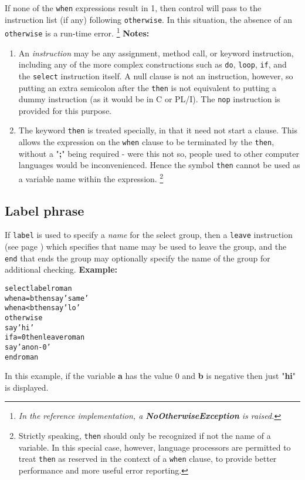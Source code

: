 If none of the \texttt{when} expressions result in 1, then control will
pass to the instruction list (if any) following \texttt{otherwise}.
In this situation, the absence of an \texttt{otherwise} is a run-time
error.
\footnote{
\emph{In the reference implementation, a \textbf{NoOtherwiseException}
is raised.}
}
 \textbf{Notes:}
\begin{enumerate}
\item An \emph{instruction} may be any assignment, method call, or keyword
instruction, including any of the more complex constructions such as
\texttt{do}, \texttt{loop}, \texttt{if}, and the \texttt{select}
instruction itself.
A null clause is not an instruction, however, so putting an extra
semicolon after the \texttt{then} is not equivalent to putting a dummy
instruction (as it would be in C or PL/I).
The \texttt{nop} instruction is provided for this purpose.
\item The keyword \texttt{then} is treated specially, in that it need not
start a clause.
This allows the expression on the \texttt{when} clause to be terminated
by the \texttt{then}, without a "\textbf{;}" being required
- were this not so, people used to other computer languages would
be inconvenienced.
Hence the symbol \texttt{then} cannot be used as a variable name within
the expression.
\footnote{
Strictly speaking, \texttt{then} should only be recognized if not
the name of a variable.  In this special case, however, \nr{} language
processors are permitted to treat \texttt{then} as reserved in the
context of a \texttt{when} clause, to provide better performance and
more useful error reporting.
}
\end{enumerate}
\subsection{Label phrase}
 
If \texttt{label} is used to specify a \emph{name} for the select
group, then a  \texttt{leave} instruction (see page \pageref{refleave})  which
specifies that name may be used to leave the group, and the \texttt{end}
that ends the group may optionally specify the name of the group for
additional checking.
 \textbf{Example:}
\begin{alltt}
select label roman
  when a=b then say 'same'
  when a<b then say 'lo'
  otherwise
    say 'hi'
    if a=0 then leave roman
    say 'a non-0'
  end roman
\end{alltt}
In this example, if the variable \textbf{a} has the value 0
and \textbf{b} is negative then just "\textbf{hi}" is
displayed.
